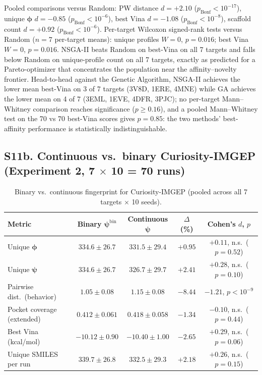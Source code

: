 \documentclass[journal=jcisd8,manuscript=suppinfo]{achemso}
\begin{document}
Pooled comparisons versus Random: PW distance $d = +2.10$ ($p_\mathrm{Bonf} < 10^{-17}$), unique $\boldsymbol{\phi}$ $d = -0.85$ ($p_\mathrm{Bonf} < 10^{-6}$), best Vina $d = -1.08$ ($p_\mathrm{Bonf} < 10^{-8}$), scaffold count $d = +0.92$ ($p_\mathrm{Bonf} < 10^{-6}$). Per-target Wilcoxon signed-rank tests versus Random ($n = 7$ per-target means): unique profiles $W = 0$, $p = 0.016$; best Vina $W = 0$, $p = 0.016$. NSGA-II beats Random on best-Vina on all 7 targets and falls below Random on unique-profile count on all 7 targets, exactly as predicted for a Pareto-optimizer that concentrates the population near the affinity--novelty frontier. Head-to-head against the Genetic Algorithm, NSGA-II achieves the lower mean best-Vina on 3 of 7 targets (3V8D, 1ERE, 4MNE) while GA achieves the lower mean on 4 of 7 (3EML, 1EVE, 4DFR, 3PJC); no per-target Mann--Whitney comparison reaches significance ($p \geq 0.16$), and a pooled Mann--Whitney test on the 70 vs 70 best-Vina scores gives $p = 0.85$: the two methods' best-affinity performance is statistically indistinguishable.

\subsection*{S11b. Continuous vs.\ binary Curiosity-IMGEP (Experiment 2, 7 $\times$ 10 = 70 runs)}

\begin{table}[ht]
\centering
\caption{Binary vs.\ continuous fingerprint for Curiosity-IMGEP (pooled across all 7 targets $\times$ 10 seeds).}
\label{tab:binary_vs_continuous}
\small
\begin{tabular}{lcccc}
\toprule
\textbf{Metric} & \textbf{Binary $\boldsymbol{\psi}^{\mathrm{bin}}$} & \textbf{Continuous $\boldsymbol{\psi}$} & \textbf{$\Delta$ (\%)} & \textbf{Cohen's $d$, $p$} \\
\midrule
Unique $\boldsymbol{\phi}$          & $334.6 \pm 26.7$ & $331.5 \pm 29.4$ & $+0.95$   & $+0.11$, n.s.\ ($p = 0.52$) \\
Unique $\boldsymbol{\psi}$          & $334.6 \pm 26.7$ & $326.7 \pm 29.7$ & $+2.41$   & $+0.28$, n.s.\ ($p = 0.10$) \\
Pairwise dist.\ (behavior)          & $1.05 \pm 0.08$  & $1.15 \pm 0.08$  & $-8.44$   & $-1.21$, $p < 10^{-9}$ \\
Pocket coverage (extended)          & $0.412 \pm 0.061$ & $0.418 \pm 0.058$ & $-1.34$   & $-0.10$, n.s.\ ($p = 0.44$) \\
Best Vina (kcal/mol)                & $-10.12 \pm 0.90$ & $-10.40 \pm 1.00$ & $-2.65$  & $+0.29$, n.s.\ ($p = 0.06$) \\
Unique SMILES per run               & $339.7 \pm 26.8$ & $332.5 \pm 29.3$ & $+2.18$   & $+0.26$, n.s.\ ($p = 0.15$) \\
\bottomrule
\end{tabular}
\end{table}
\end{document}
